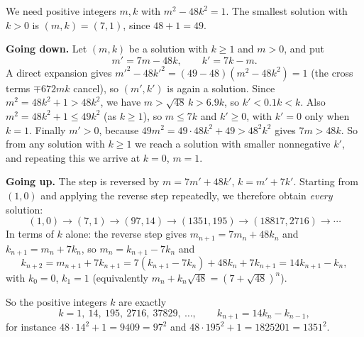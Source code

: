 We need positive integers $m,k$ with $m^2-48k^2=1$. The smallest solution with $k>0$ is $(m,k)=(7,1)$, since $48+1=49$.

\textbf{Going down.} Let $(m,k)$ be a solution with $k\ge1$ and $m>0$, and put
\[
m'=7m-48k,\qquad k'=7k-m .
\]
A direct expansion gives $m'^2-48k'^2=(49-48)(m^2-48k^2)=1$ (the cross terms $\mp672mk$ cancel), so $(m',k')$ is again a solution. Since $m^2=48k^2+1>48k^2$, we have $m>\sqrt{48}\,k>6.9k$, so $k'<0.1k<k$. Also $m^2=48k^2+1\le49k^2$ (as $k\ge1$), so $m\le7k$ and $k'\ge0$, with $k'=0$ only when $k=1$. Finally $m'>0$, because $49m^2=49\cdot48k^2+49>48^2k^2$ gives $7m>48k$. So from any solution with $k\ge1$ we reach a solution with smaller nonnegative $k'$, and repeating this we arrive at $k=0$, $m=1$.

\textbf{Going up.} The step is reversed by $m=7m'+48k'$, $k=m'+7k'$. Starting from $(1,0)$ and applying the reverse step repeatedly, we therefore obtain \emph{every} solution:
\[
(1,0)\to(7,1)\to(97,14)\to(1351,195)\to(18817,2716)\to\cdots
\]
In terms of $k$ alone: the reverse step gives $m_{n+1}=7m_n+48k_n$ and $k_{n+1}=m_n+7k_n$, so $m_n=k_{n+1}-7k_n$ and
\[
k_{n+2}=m_{n+1}+7k_{n+1}=7(k_{n+1}-7k_n)+48k_n+7k_{n+1}=14k_{n+1}-k_n ,
\]
with $k_0=0$, $k_1=1$ (equivalently $m_n+k_n\sqrt{48}=(7+\sqrt{48})^n$).

So the positive integers $k$ are exactly
\[
\boxed{k=1,\ 14,\ 195,\ 2716,\ 37829,\ \dots},\qquad k_{n+1}=14k_n-k_{n-1},
\]
for instance $48\cdot14^2+1=9409=97^2$ and $48\cdot195^2+1=1825201=1351^2$.
